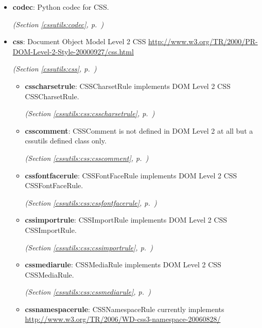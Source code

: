 \begin{itemize}
\setlength{\parskip}{0ex}
\item \textbf{codec}: 
Python codec for CSS.


  \textit{(Section \ref{cssutils:codec}, p.~\pageref{cssutils:codec})}

\item \textbf{css}: 
Document Object Model Level 2 CSS
\href{http://www.w3.org/TR/2000/PR-DOM-Level-2-Style-20000927/css.html}{http://www.w3.org/TR/2000/PR-DOM-Level-2-Style-20000927/css.html}


  \textit{(Section \ref{cssutils:css}, p.~\pageref{cssutils:css})}

  \begin{itemize}
\setlength{\parskip}{0ex}
    \item \textbf{csscharsetrule}: 
CSSCharsetRule implements DOM Level 2 CSS CSSCharsetRule.


  \textit{(Section \ref{cssutils:css:csscharsetrule}, p.~\pageref{cssutils:css:csscharsetrule})}

    \item \textbf{csscomment}: 
CSSComment is not defined in DOM Level 2 at all but a cssutils defined
class only.


  \textit{(Section \ref{cssutils:css:csscomment}, p.~\pageref{cssutils:css:csscomment})}

    \item \textbf{cssfontfacerule}: 
CSSFontFaceRule implements DOM Level 2 CSS CSSFontFaceRule.


  \textit{(Section \ref{cssutils:css:cssfontfacerule}, p.~\pageref{cssutils:css:cssfontfacerule})}

    \item \textbf{cssimportrule}: 
CSSImportRule implements DOM Level 2 CSS CSSImportRule.


  \textit{(Section \ref{cssutils:css:cssimportrule}, p.~\pageref{cssutils:css:cssimportrule})}

    \item \textbf{cssmediarule}: 
CSSMediaRule implements DOM Level 2 CSS CSSMediaRule.


  \textit{(Section \ref{cssutils:css:cssmediarule}, p.~\pageref{cssutils:css:cssmediarule})}

    \item \textbf{cssnamespacerule}: 
CSSNamespaceRule currently implements
\href{http://www.w3.org/TR/2006/WD-css3-namespace-20060828/}{http://www.w3.org/TR/2006/WD-css3-namespace-20060828/}



\end{itemize}
\end{itemize}
